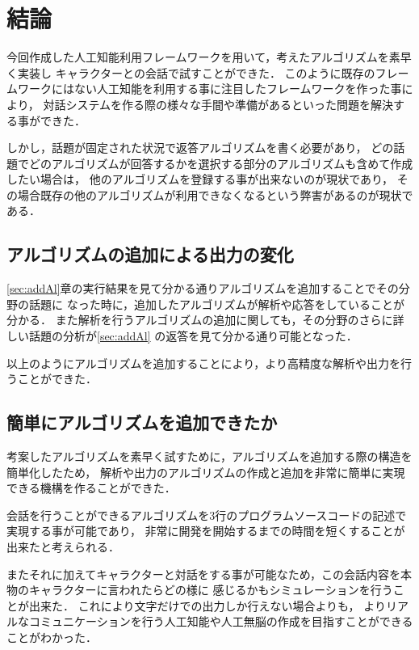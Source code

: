 \section{結論}
今回作成した人工知能利用フレームワークを用いて，考えたアルゴリズムを素早く実装し
キャラクターとの会話で試すことができた．
このように既存のフレームワークにはない人工知能を利用する事に注目したフレームワークを作った事により，
対話システムを作る際の様々な手間や準備があるといった問題を解決する事ができた．

しかし，話題が固定された状況で返答アルゴリズムを書く必要があり，
どの話題でどのアルゴリズムが回答するかを選択する部分のアルゴリズムも含めて作成したい場合は，
他のアルゴリズムを登録する事が出来ないのが現状であり，
その場合既存の他のアルゴリズムが利用できなくなるという弊害があるのが現状である．

\subsection{アルゴリズムの追加による出力の変化}
\ref{sec:addAl}章の実行結果を見て分かる通りアルゴリズムを追加することでその分野の話題に
なった時に，追加したアルゴリズムが解析や応答をしていることが分かる．
また解析を行うアルゴリズムの追加に関しても，その分野のさらに詳しい話題の分析が\ref{sec:addAl}
の返答を見て分かる通り可能となった．

以上のようにアルゴリズムを追加することにより，より高精度な解析や出力を行うことができた．

\subsection{簡単にアルゴリズムを追加できたか}
考案したアルゴリズムを素早く試すために，アルゴリズムを追加する際の構造を簡単化したため，
解析や出力のアルゴリズムの作成と追加を非常に簡単に実現できる機構を作ることができた．

会話を行うことができるアルゴリズムを3行のプログラムソースコードの記述で実現する事が可能であり，
非常に開発を開始するまでの時間を短くすることが出来たと考えられる．

またそれに加えてキャラクターと対話をする事が可能なため，この会話内容を本物のキャラクターに言われたらどの様に
感じるかもシミュレーションを行うことが出来た．
これにより文字だけでの出力しか行えない場合よりも，
よりリアルなコミュニケーションを行う人工知能や人工無脳の作成を目指すことができることがわかった．
